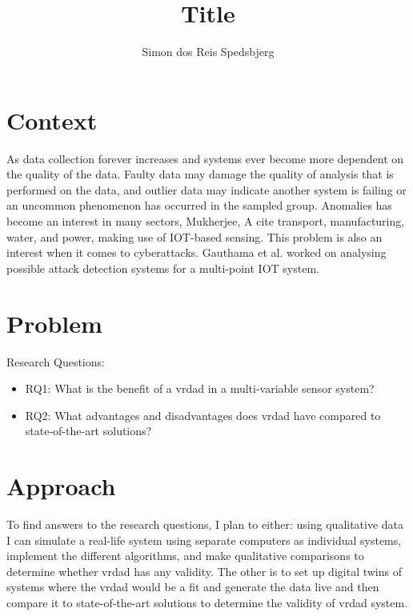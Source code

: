 \documentclass[a4paper,8pt]{article}
\title{Title}
\author{Simon dos Reis Spedsbjerg}
\begin{document}
	\maketitle
	\section{Context}
		As data collection forever increases and systems ever become more dependent on the quality of the data. Faulty data may damage the quality of analysis that is performed on the data, and outlier data may indicate another system is failing or an uncommon phenomenon has occurred in the sampled group. Anomalies has become an interest in many sectors, Mukherjee, A\cite{MUKHERJEE2024102444} cite transport, manufacturing, water, and power, making use of IOT-based sensing. This problem is also an interest when it comes to cyberattacks. Gauthama et al. worked on analysing possible attack detection systems for a multi-point IOT system\cite{MR2022103046}.
			
	\section{Problem}
		Research Questions:
		\begin{itemize}
			\item RQ1: What is the benefit of a \gls{vrdad} in a multi-variable sensor system?
			\item RQ2: What advantages and disadvantages does \gls{vrdad} have compared to state-of-the-art solutions?
		\end{itemize}
	
	\section{Approach}
		To find answers to the research questions, I plan to either: using qualitative data I can simulate a real-life system using separate computers as individual systems, implement the different algorithms, and make qualitative comparisons to determine whether \gls{vrdad} has any validity. The other is to set up digital twins of systems where the \gls{vrdad} would be a fit and generate the data live and then compare it to state-of-the-art solutions to determine the validity of \gls{vrdad} system.
		
		
\end{document}

